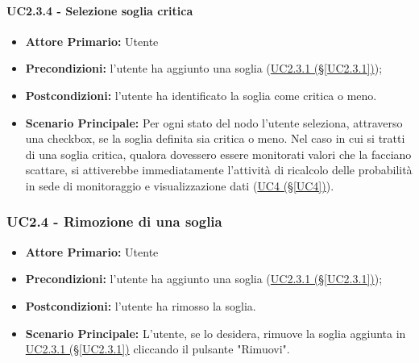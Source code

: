 \paragraph{UC2.3.4 - Selezione soglia critica}\label{UC2.3.4}
\begin{itemize}
	\item \textbf{Attore Primario:} Utente
	\item \textbf{Precondizioni:} l'utente ha aggiunto una soglia (\hyperref[UC2.3.1]{UC2.3.1 (§\ref*{UC2.3.1})});
	\item \textbf{Postcondizioni:} l'utente ha identificato la soglia come critica o meno.
	\item \textbf{Scenario Principale:} Per ogni stato del nodo l'utente seleziona, attraverso una checkbox, se la soglia definita sia critica o meno. Nel caso in cui si tratti di una soglia critica, qualora dovessero essere monitorati valori che la facciano scattare, si attiverebbe immediatamente l'attività di ricalcolo delle probabilità in sede di monitoraggio e visualizzazione dati (\hyperref[UC4]{UC4 (§\ref*{UC4})}). 
\end{itemize}

\pagebreak

\subsubsection{UC2.4 - Rimozione di una soglia}\label{UC2.4}
\begin{itemize}
	\item \textbf{Attore Primario:} Utente
	\item \textbf{Precondizioni:} l'utente ha aggiunto una soglia (\hyperref[UC2.3.1]{UC2.3.1 (§\ref*{UC2.3.1})});
	\item \textbf{Postcondizioni:} l'utente ha rimosso la soglia.
	\item \textbf{Scenario Principale:} L'utente, se lo desidera, rimuove la soglia aggiunta in \hyperref[UC2.3.1]{UC2.3.1 (§\ref*{UC2.3.1})} cliccando il pulsante "Rimuovi". 
\end{itemize}

